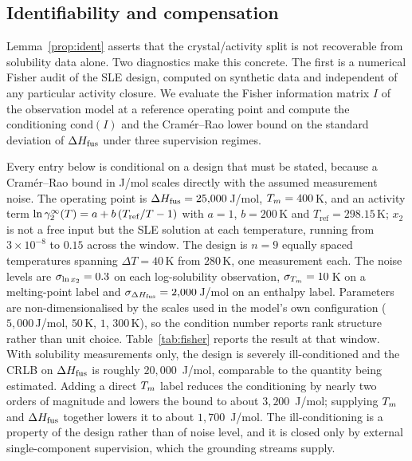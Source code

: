 \subsection{Identifiability and compensation} \label{sec:ident}

Lemma~\ref{prop:ident} asserts that the crystal/activity split is not recoverable from solubility data alone. Two diagnostics make this concrete. The first is a numerical Fisher audit of the SLE design, computed on synthetic data and independent of any particular activity closure. We evaluate the Fisher information matrix $I$ of the observation model at a reference operating point and compute the conditioning $\mathrm{cond}(I)$ and the Cram\'er--Rao lower bound on the standard deviation of $\Delta H_{\mathrm{fus}}$ under three supervision regimes.

Every entry below is conditional on a design that must be stated, because a Cram\'er--Rao bound in J/mol scales directly with the assumed measurement noise. The operating point is $\Delta H_{\mathrm{fus}}=25{,}000$\,J/mol, $T_m=400$\,K, and an activity term $\ln\gamma_2^\infty(T)=a+b\,(T_{\mathrm{ref}}/T-1)$ with $a=1$, $b=200$\,K and $T_{\mathrm{ref}}=298.15$\,K; $x_2$ is not a free input but the SLE solution at each temperature, running from $3\times10^{-8}$ to $0.15$ across the window. The design is $n=9$ equally spaced temperatures spanning $\Delta T=40$\,K from $280$\,K, one measurement each. The noise levels are $\sigma_{\ln x_2}=0.3$ on each log-solubility observation, $\sigma_{T_m}=10$\,K on a melting-point label and $\sigma_{\Delta H_{\mathrm{fus}}}=2{,}000$\,J/mol on an enthalpy label. Parameters are non-dimensionalised by the scales used in the model's own configuration ($5{,}000$\,J/mol, $50$\,K, $1$, $300$\,K), so the condition number reports rank structure rather than unit choice. Table~\ref{tab:fisher} reports the result at that window. With solubility measurements only, the design is severely ill-conditioned and the CRLB on $\Delta H_{\mathrm{fus}}$ is roughly $20{,}000$~J/mol, comparable to the quantity being estimated. Adding a direct $T_m$ label reduces the conditioning by nearly two orders of magnitude and lowers the bound to about $3{,}200$~J/mol; supplying $T_m$ and $\Delta H_{\mathrm{fus}}$ together lowers it to about $1{,}700$~J/mol. The ill-conditioning is a property of the design rather than of noise level, and it is closed only by external single-component supervision, which the grounding streams supply.

\begin{table}[t]
\centering
\caption[Fisher audit of the SLE design]{Fisher audit of the SLE design at $\Delta T=40$\,K (synthetic,
closure-independent).}
\label{tab:fisher}
\end{table}


